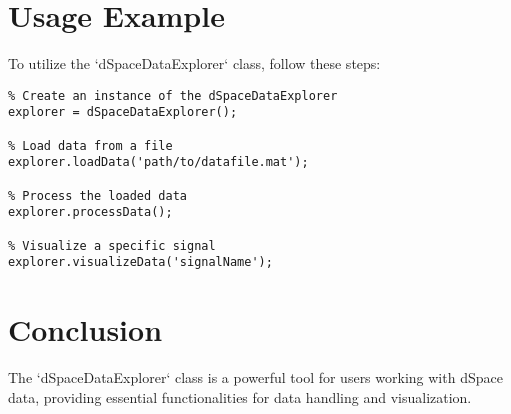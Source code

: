\documentclass{article}
\begin{document}
\section{Usage Example}
To utilize the `dSpaceDataExplorer` class, follow these steps:

\begin{verbatim}
% Create an instance of the dSpaceDataExplorer
explorer = dSpaceDataExplorer();

% Load data from a file
explorer.loadData('path/to/datafile.mat');

% Process the loaded data
explorer.processData();

% Visualize a specific signal
explorer.visualizeData('signalName');
\end{verbatim}

\section{Conclusion}
The `dSpaceDataExplorer` class is a powerful tool for users working with dSpace data, providing essential functionalities for data handling and visualization.
\end{document}

